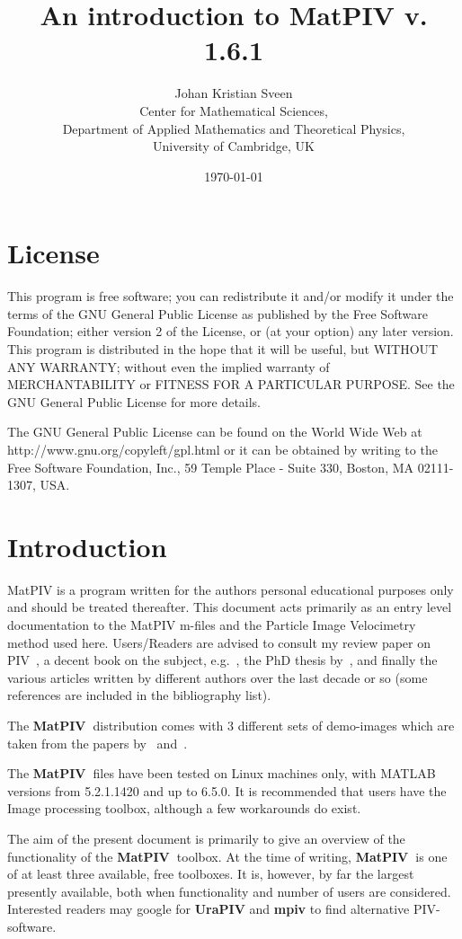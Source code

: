 \documentclass{book}
\title{An introduction to {\bf MatPIV} v. 1.6.1}
\author{Johan Kristian Sveen\\
{\small Center for Mathematical Sciences,} \\
{\small Department of Applied Mathematics and Theoretical Physics,} \\
{\small University of Cambridge, UK}}
\date{\today}
\newcommand{\matpiv}{{\bf MatPIV~}}
\begin{document}
\maketitle


\chapter*{License}

This program is free software; you can redistribute it and/or modify it
under the terms of the GNU General Public License as published by the
Free Software Foundation; either version 2 of the License, or (at your
option) any later version. This program is distributed in the hope that
it will be useful, but WITHOUT ANY WARRANTY; without even the implied
warranty of MERCHANTABILITY or FITNESS FOR A PARTICULAR PURPOSE. See the
GNU General Public License for more details.

The GNU General Public License can be found on the World Wide Web at
http://www.gnu.org/copyleft/gpl.html or it can be obtained by writing to
the Free Software Foundation, Inc., 59 Temple Place - Suite 330, Boston,
MA 02111-1307, USA.




\tableofcontents
\newpage
\chapter*{Introduction}

MatPIV is a program written for the authors personal educational
purposes only and should be treated thereafter. This document acts
primarily as an entry level documentation to the MatPIV m-files and the
Particle Image Velocimetry method used here. Users/Readers are advised
to consult my review paper on PIV~\citep{Sveen:2004}, a decent book on the
subject, e.g.~\cite{Raffel:1998}, the PhD thesis
by~\cite{Westerweel:1993}, and finally the various articles written by
different authors over the last decade or so (some references are
included in the bibliography list). 

The \matpiv distribution comes with 3 different sets of demo-images
which are taken from the papers by~\cite{Grue:1999}
and~\cite{Jensen:1999}.

The \matpiv files have been tested on Linux machines only, with MATLAB
versions from 5.2.1.1420 and up to 6.5.0. It is recommended that users
have the Image processing toolbox, although a few workarounds do
exist.

The aim of the present document is primarily to give an overview of the
functionality of the \matpiv toolbox. At the time of writing, \matpiv is
one of at least three available, free toolboxes. It is, however, by far
the largest presently available, both when functionality and number of
users are considered. Interested readers may google for {\bf UraPIV} and
{\bf mpiv} to find alternative PIV-software.
\end{document}
